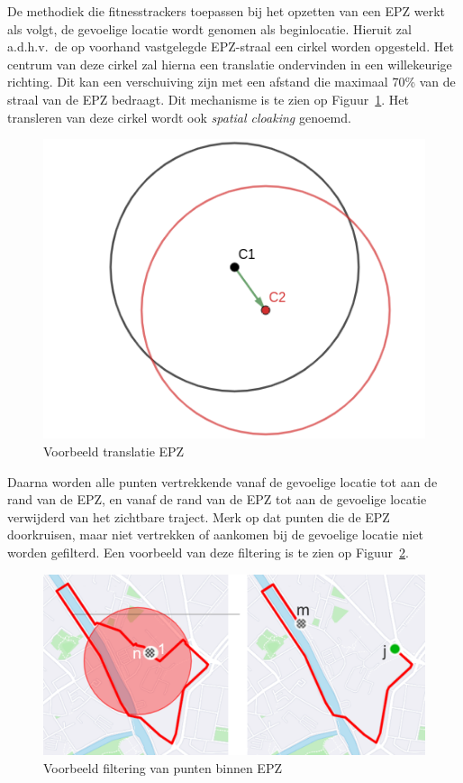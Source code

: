 De methodiek die fitnesstrackers toepassen bij het opzetten van een \ac{EPZ}
werkt als volgt, de gevoelige locatie wordt genomen als beginlocatie. Hieruit
zal a.d.h.v.\ de op voorhand vastgelegde \ac{EPZ}-straal een cirkel worden
opgesteld. Het centrum van deze cirkel zal hierna een translatie ondervinden in
een willekeurige richting. Dit kan een verschuiving zijn met een afstand die
maximaal 70\% van de straal van de \ac{EPZ} bedraagt. Dit mechanisme is te zien
op Figuur~\ref{fig:translation}. Het transleren van deze cirkel wordt ook
\textit{spatial cloaking} genoemd.
\begin{figure}[h]
    \centering
    \includegraphics[width=0.4\linewidth]{fig/EPZ-mechanisme/Translation_Center.png}
    \caption{Voorbeeld translatie EPZ}\label{fig:translation}
\end{figure}

Daarna worden alle punten vertrekkende vanaf de gevoelige locatie tot aan de
rand van de \ac{EPZ}, en vanaf de rand van de \ac{EPZ} tot aan de gevoelige
locatie verwijderd van het zichtbare traject. Merk op dat punten die de
\ac{EPZ} doorkruisen, maar niet vertrekken of aankomen bij de gevoelige locatie
niet worden gefilterd. Een voorbeeld van deze filtering is te zien op
Figuur~\ref{fig:drop points}.
\begin{figure}[h]
    \centering
    \includegraphics[width=0.7\linewidth]{fig/EPZ-mechanisme/DropEPZPoints.png}
    \caption{Voorbeeld filtering van punten binnen \ac{EPZ}}\label{fig:drop points}
\end{figure}

